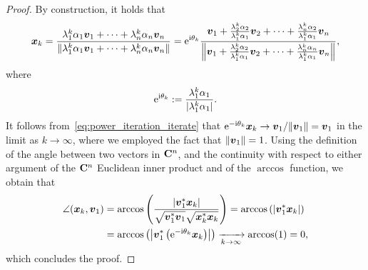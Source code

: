 \begin{proof}
    By construction,
    it holds that
    \begin{equation}
        \label{eq:power_iteration_iterate}
        \vect x_k
        = \frac{\lambda_1^k \alpha_1 \vect v_1 + \dotsb + \lambda_n^k \alpha_n \vect v_n}{\norm{\lambda_1^k \alpha_1 \vect v_1 + \dotsb + \lambda_n^k \alpha_n \vect v_n}}
        = \e^{\i \theta_k} \frac{\vect v_1 + \frac{\lambda_2^k \alpha_2}{\lambda_1^k \alpha_1} \vect v_2 +  \dotsb + \frac{\lambda_n^k \alpha_2}{\lambda_1^k \alpha_1} \vect v_n }{\norm*{\vect v_1 + \frac{\lambda_2^k \alpha_2}{\lambda_1^k \alpha_1} \vect v_2 +  \dotsb + \frac{\lambda_n^k \alpha_n}{\lambda_1^k \alpha_1} \vect v_n}},
    \end{equation}
    where
    \[
        \e^{\i \theta_k} := \frac{\lambda_1^k \alpha_1}{\abs{\lambda_1^k \alpha_1}}.
    \]
    It follows from~\eqref{eq:power_iteration_iterate} that $\e^{-\i \theta_k} \vect x_k \to \vect v_1/ \norm{\vect v_1} = \vect v_1$ in the limit as $k \to \infty$,
    where we employed the fact that $\norm{\vect v_1} = 1$.
    Using the definition of the angle between two vectors in $\complex^n$,
    and the continuity with respect to either argument of the $\complex^n$ Euclidean inner product and of the $\arccos$ function,
    we obtain that
    \begin{align*}
        \angle(\vect x_k, \vect v_1)
        &= \arccos\left( \frac{\abs{\vect v_1^* \vect x_k}}{\sqrt{\vect v_1^* \vect v_1} \sqrt{\vect x_k^* \vect x_k}}\right) = \arccos\left(\abs{\vect v_1^* \vect x_k} \right) \\
        &= \arccos\left( \abs*{\vect v_1^*\left(\e^{-\i \theta_k}\vect x_k\right)} \right)
        \xrightarrow[k \to \infty]{} \arccos(1) = 0,
    \end{align*}
    which concludes the proof.
\end{proof}


